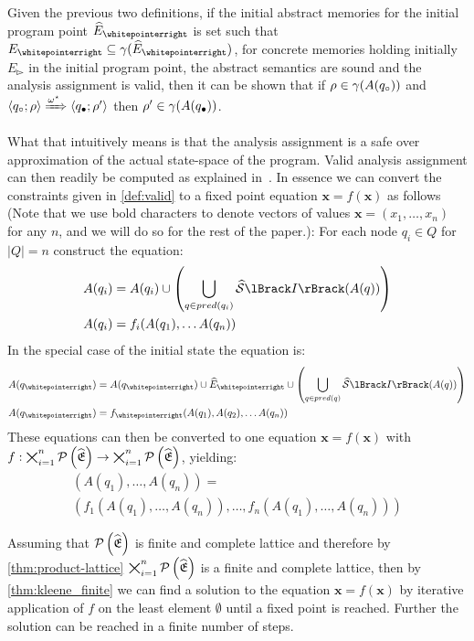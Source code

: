 Given the previous two definitions, if the initial abstract memories for the initial program point $\ab{E}_\whitepointerright$ is set such that $E_{\whitepointerright} \subseteq \concrete(\ab{E}_\whitepointerright)$, for concrete memories holding initially $E_{\whitepointerright}$ in the initial program point, the abstract semantics are sound and the analysis assignment is valid, then it can be shown that if $\rho \in \gamma(A(q_\circ))$ and $\langle q_\circ; \rho \rangle \xRightarrow{\omega^\star} \langle q_\bullet; \rho' \rangle$ then $\rho' \in \gamma(A(q_\bullet))$.

What that intuitively means is that the analysis assignment is a safe over approximation of the actual state-space of the program.
Valid analysis assignment can then readily be computed as explained in~\cite{nielson_formal_2019}.
In essence we can convert the constraints given in \autoref{def:valid} to a fixed point equation $\mathbf{x} = f(\mathbf{x})$ as follows (Note that we use bold characters to denote vectors of values $\mathbf{x} = (x_1, \dots, x_n)$ for any $n$, and we will do so for the rest of the paper.):
For each node $q_i \in Q$ for $|Q| = n$ construct the equation:
\begin{align} \label{eq:q}
    A(q_i) &= A(q_i) \cup \left(\bigcup_{q \in pred(q_i)} \abssem{I}(A(q))\right) \\
    A(q_i) &= f_i(A(q_1), \dots A(q_n))
\end{align}
In the special case of the initial state the equation is:
\begin{align}
    A(q_\whitepointerright) &= A(q_\whitepointerright) \cup \ab{E}_\whitepointerright \cup  \left(\bigcup_{q \in pred(q)} \abssem{I}(A(q))\right) \\
    A(q_\whitepointerright) &= f_\whitepointerright(A(q_1), A(q_2), \dots A(q_n))
\end{align}
These equations can then be converted to one equation $\mathbf{x} = f(\mathbf{x})$ with $f : \bigtimes_{i = 1}^n \mathcal{P}\left(\widehat{\mathfrak{E}}\right) \rightarrow \bigtimes_{i = 1}^n \mathcal{P}\left(\widehat{\mathfrak{E}}\right)$, yielding:
\begin{multline}\label{eq:constraint}
    (A(q_1), \dots, A(q_n)) = \\
    (f_1(A(q_1), \dots, A(q_n)), \dots, f_n(A(q_1), \dots, A(q_n)))
\end{multline}

Assuming that $\mathcal{P}\left(\widehat{\mathfrak{E}}\right)$ is finite and complete lattice and therefore by \autoref{thm:product-lattice} $\bigtimes_{i = 1}^n \mathcal{P}\left(\widehat{\mathfrak{E}}\right)$ is a finite and complete lattice, then by \autoref{thm:kleene_finite} we can find a solution to the equation $\mathbf{x} = f(\mathbf{x})$ by iterative application of $f$ on the least element $\emptyset$ until a fixed point is reached.
Further the solution can be reached in a finite number of steps.
